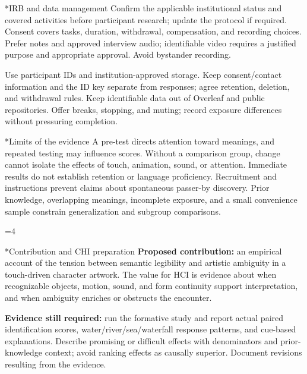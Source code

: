 \documentclass[10pt,letterpaper]{article}
\makeatletter
\renewcommand\section{\@startsection{section}{1}{0pt}{8pt}{4pt}{\normalfont\large\bfseries}}
\newcommand{\nextpage}[1]{\clearpage\ifnum\value{page}=#1\relax\else\PackageError{proposal-length}{A planned page overflowed}{Shorten the preceding page.}\fi}
\makeatother
\begin{document}
\section*{IRB and data management}
Confirm the applicable institutional status and covered activities before participant research; update the protocol if required. Consent covers tasks, duration, withdrawal, compensation, and recording choices. Prefer notes and approved interview audio; identifiable video requires a justified purpose and appropriate approval. Avoid bystander recording.

Use participant IDs and institution-approved storage. Keep consent/contact information and the ID key separate from responses; agree retention, deletion, and withdrawal rules. Keep identifiable data out of Overleaf and public repositories. Offer breaks, stopping, and muting; record exposure differences without pressuring completion.

\section*{Limits of the evidence}
A pre-test directs attention toward meanings, and repeated testing may influence scores. Without a comparison group, change cannot isolate the effects of touch, animation, sound, or attention. Immediate results do not establish retention or language proficiency. Recruitment and instructions prevent claims about spontaneous passer-by discovery. Prior knowledge, overlapping meanings, incomplete exposure, and a small convenience sample constrain generalization and subgroup comparisons.

\nextpage{4}
\section*{Contribution and CHI preparation}
\textbf{Proposed contribution:} an empirical account of the tension between semantic legibility and artistic ambiguity in a touch-driven character artwork. The value for HCI is evidence about when recognizable objects, motion, sound, and form continuity support interpretation, and when ambiguity enriches or obstructs the encounter.

\textbf{Evidence still required:} run the formative study and report actual paired identification scores, water/river/sea/waterfall response patterns, and cue-based explanations. Describe promising or difficult effects with denominators and prior-knowledge context; avoid ranking effects as causally superior. Document revisions resulting from the evidence.
\end{document}

